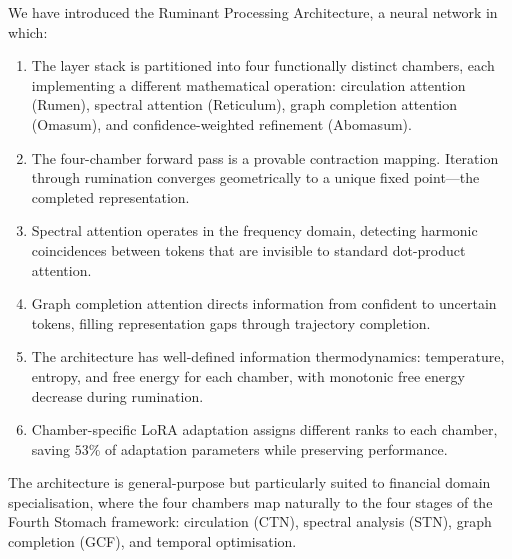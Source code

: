 \documentclass[twocolumn,10pt]{article}
\theoremstyle{remark}
\begin{document}
We have introduced the Ruminant Processing Architecture, a neural network in which:

\begin{enumerate}[label=\arabic*.]
    \item The layer stack is partitioned into four functionally distinct chambers, each implementing a different mathematical operation: circulation attention (Rumen), spectral attention (Reticulum), graph completion attention (Omasum), and confidence-weighted refinement (Abomasum).

    \item The four-chamber forward pass is a provable contraction mapping.  Iteration through rumination converges geometrically to a unique fixed point---the completed representation.

    \item Spectral attention operates in the frequency domain, detecting harmonic coincidences between tokens that are invisible to standard dot-product attention.

    \item Graph completion attention directs information from confident to uncertain tokens, filling representation gaps through trajectory completion.

    \item The architecture has well-defined information thermodynamics: temperature, entropy, and free energy for each chamber, with monotonic free energy decrease during rumination.

    \item Chamber-specific LoRA adaptation assigns different ranks to each chamber, saving $53\%$ of adaptation parameters while preserving performance.
\end{enumerate}

The architecture is general-purpose but particularly suited to financial domain specialisation, where the four chambers map naturally to the four stages of the Fourth Stomach framework: circulation (CTN), spectral analysis (STN), graph completion (GCF), and temporal optimisation.



\end{document}

